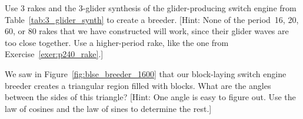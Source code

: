 \begin{problem}\label{exer:gpsw_breeder_3_glider}
	Use 3 rakes and the 3-glider synthesis of the glider-producing switch engine from Table~\ref{tab:3_glider_synth} to create a breeder. [Hint: None of the period~16, 20, 60, or 80 rakes that we have constructed will work, since their glider waves are too close together. Use a higher-period rake, like the one from Exercise~\ref{exer:p240_rake}.]
\end{problem}

\begin{problem}\label{exer:blse_breeder_triangle}
	We saw in Figure~\ref{fig:blse_breeder_1600} that our block-laying switch engine breeder creates a triangular region filled with blocks. What are the angles between the sides of this triangle? [Hint: One angle is easy to figure out. Use the law of cosines and the law of sines to determine the rest.]
\end{problem}


